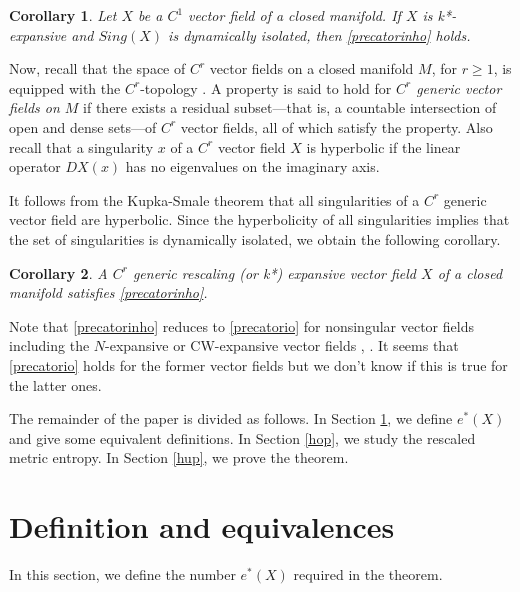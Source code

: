 \documentclass{amsart}
\newtheorem{cor}{Corollary}
\numberwithin{equation}{section}
\begin{document}
\begin{cor}
Let $X$ be a $C^1$ vector field of a closed manifold.
If $X$ is k*-expansive and $Sing(X)$ is dynamically isolated, then
\eqref{precatorinho} holds.
\end{cor}

Now, recall that the space of \( C^r \) vector fields on a closed manifold \( M \), for \( r \geq 1 \), is equipped with the \( C^r \)-topology \cite{pdm}.  
A property is said to hold for {\em \( C^r \) generic vector fields on \( M \)} if there exists a residual subset—that is, a countable intersection of open and dense sets—of \( C^r \) vector fields, all of which satisfy the property.
Also recall that a singularity \( x \) of a \( C^r \) vector field \( X \) is hyperbolic if the linear operator \( DX(x) \) has no eigenvalues on the imaginary axis.

It follows from the Kupka-Smale theorem \cite{pdm} that all singularities of a \( C^r \) generic vector field are hyperbolic. Since the hyperbolicity of all singularities implies that the set of singularities is dynamically isolated, we obtain the following corollary.


\begin{cor}
A $C^r$ generic rescaling (or k*) expansive vector field $X$ of a closed manifold satisfies \eqref{precatorinho}.
\end{cor}

Note that \eqref{precatorinho} reduces to \eqref{precatorio} for nonsingular vector fields including the $N$-expansive or CW-expansive vector fields
\cite{acop}, \cite{acp}.
It seems that \eqref{precatorio} holds for the former vector fields but we don't know if this is true for the latter ones.


The remainder of the paper is divided as follows.
In Section \ref{hit}, we define $e^*(X)$ and give some equivalent definitions.
In Section \ref{hop}, we study the rescaled metric entropy.
In Section \ref{hup}, we prove the theorem.






\section{Definition and equivalences}
\label{hit}



\noindent
In this section, we define the number $e^*(X)$ required in the theorem.
\end{document}
